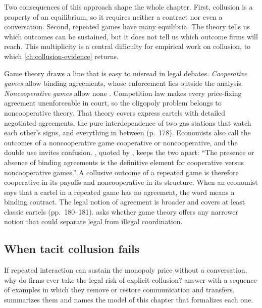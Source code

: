 Two consequences of this approach shape the whole chapter. First, collusion is a property of an equilibrium, so it
requires neither a contract nor even a conversation. Second, repeated games have many equilibria. The theory tells
us which outcomes can be sustained, but it does not tell us which outcome firms will reach. This multiplicity is a
central difficulty for empirical work on collusion, to which \cref{ch:collusion-evidence} returns.

Game theory draws a line that is easy to misread in legal debates. \emph{Cooperative games} allow binding
agreements, whose enforcement lies outside the analysis. \emph{Noncooperative games} allow none
\citep[p.~177]{Kaplow2013}. Competition law makes every price-fixing agreement unenforceable in court, so the
oligopoly problem belongs to noncooperative theory. That theory covers express cartels with detailed negotiated
agreements, the pure interdependence of two gas stations that watch each other's signs, and everything in between
(p.~178). Economists also call the outcomes of a noncooperative game cooperative or noncooperative, and the double use
invites confusion. \citet[p.~20]{Friedman1986}, quoted by \citet[p.~179]{Kaplow2013}, keeps the two apart: ``The
presence or absence of binding agreements is the definitive element for cooperative versus noncooperative games.''
A collusive outcome of a repeated game is therefore cooperative in its payoffs and noncooperative in its structure.
When an economist says that a cartel in a repeated game has no agreement, the word means a binding contract. The
legal notion of agreement is broader and covers at least classic cartels (pp.~180--181).  asks
whether game theory offers any narrower notion that could separate legal from illegal coordination.

\subsection{When tacit collusion fails}\label{sec:12-tacit-fails}

If repeated interaction can sustain the monopoly price without a conversation, why do firms ever take the legal
risk of explicit collusion? \citet[pp.~9--17]{MarshallMarx2012} answer with a sequence of examples in which they
remove or restore communication and transfers.  summarizes them and names the model of this
chapter that formalizes each one.

